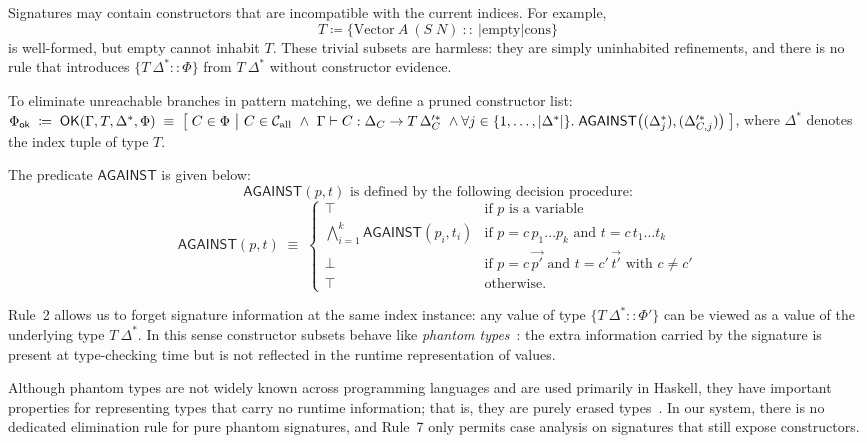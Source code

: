 \documentclass[a4paper, anonymous, UKenglish,cleveref, autoref, thm-restate]{lipics-v2021}
\begin{document}
Signatures may contain constructors that are incompatible with the current indices. For example,
\[
T \coloneqq \{\text{Vector}\:A\:(S\;N)\:::\:|\text{empty}|\text{cons}\}
\]
is well-formed, but $\text{empty}$ cannot inhabit $T$. These trivial subsets are harmless: they are simply uninhabited refinements, and there is no rule that introduces $\{T\:\Delta^{*}::\Phi\}$ from $T\:\Delta^{*}$ without constructor evidence.

To eliminate unreachable branches in pattern matching, we define a pruned constructor list:
\begin{math}
\Phi_{\mathsf{ok}}
\;\coloneqq\;
\mathsf{OK}(\Gamma,T,\Delta^{*},\Phi)
\;\equiv\; 
\bigl[\; C \in \Phi \ \big|\ 
  C \in \mathcal{C}_{\text{all}}
  \ \land\ 
  \Gamma \vdash C : \Delta_C \rightarrow T\,\Delta_C'^{*}
  \ \land\ \\
  \forall j \in \{1,\dots,|\Delta^{*}|\}.\;
    \mathsf{AGAINST}\bigl((\Delta^{*}_j),(\Delta_{C,j}'^{*})\bigr)
\;\bigr]
\end{math}, where $\Delta^{*}$ denotes the index tuple of type $T$.

The predicate $\mathsf{AGAINST}$ is given below:
\[
\mathsf{AGAINST}(p,t) \text{ is defined by the following decision procedure:}
\]
\[
\mathsf{AGAINST}(p,t) \;\equiv\;
\begin{cases}
\top
  & \text{if } p \text{ is a variable} \\
\bigwedge_{i=1}^{k}\mathsf{AGAINST}(p_i,t_i)
  & \text{if } p = c\,p_1\ldots p_k \text{ and } t = c\,t_1\ldots t_k \\
\bot
  & \text{if } p = c\,\overrightarrow{p'} \text{ and } t = c'\,\overrightarrow{t'}
    \text{ with } c \neq c' \\
\top
  & \text{otherwise.}
\end{cases}
\]

Rule~2 allows us to forget signature information at the same index instance: any value of type $\{T\:\Delta^{*} :: \Phi' \}$ can be viewed as a value of the underlying type $T\:\Delta^{*}$. In this sense constructor subsets behave like \emph{phantom types}~\cite{fluet2005practical}: the extra information carried by the signature is present at type-checking time but is not reflected in the runtime representation of values.
	
Although phantom types are not widely known across programming languages and are used primarily in Haskell, they have important properties for representing types that carry no runtime information; that is, they are purely erased types~\cite{fluet2005practical}. In our system, there is no dedicated elimination rule for pure phantom signatures, and Rule~7 only permits case analysis on signatures that still expose constructors.
\end{document}
